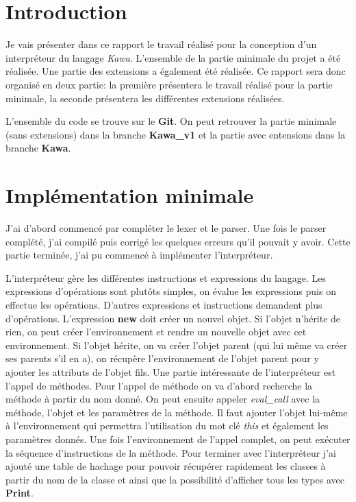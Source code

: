 \documentclass{article}
\begin{document}
\section{Introduction}
Je vais présenter dans ce rapport le travail réalisé pour la conception d'un interpréteur du langage \textit{Kawa}. L'ensemble de la partie minimale du projet a été réalisée. Une partie des 
extensions a également été réalisée. Ce rapport sera donc organisé en deux partie: la première présentera le travail réalisé pour la partie minimale, la seconde présentera les différentes 
extensions réalisées.

L'ensemble du code se trouve sur le \textbf{Git}. On peut retrouver la partie minimale (sans extensions) dans la branche \textbf{Kawa\_v1} et la partie avec entensions dans la 
branche \textbf{Kawa}.

\section{Implémentation minimale}
J'ai d'abord commencé par compléter le lexer et le parser. Une fois le parser complété, j'ai compilé puis corrigé les quelques erreurs qu'il pouvait y avoir.
Cette partie terminée, j'ai pu commencé à implémenter l'interpréteur.

L'interpréteur gère les différentes instructions et expressions du langage. Les expressions d'opérations sont plutôts simples, on évalue les expressions puis on effectue les opérations.
D'autres expressions et instructions demandent plus d'opérations.
L'expression \textbf{new} doit créer un nouvel objet. Si l'objet n'hérite de rien, on peut créer l'environnement et rendre un nouvelle objet avec cet environnement. Si l'objet hérite, 
on va créer l'objet parent (qui lui même va créer ses parents s'il en a), on récupère l'environnement de l'objet parent pour y ajouter les attributs de l'objet fils.
Une partie intéressante de l'interpréteur est l'appel de méthodes. Pour l'appel de méthode on va d'abord recherche la méthode à partir du nom donné. On peut ensuite appeler \textit{eval\_call} 
avec la méthode, l'objet et les paramètres de la méthode. Il faut ajouter l'objet lui-même à l'environnement qui permettra l'utilisation du mot clé \textit{this} et également les paramètres 
donnés. Une fois l'environnement de l'appel complet, on peut exécuter la séquence d'instructions de la méthode.
Pour terminer avec l'interpréteur j'ai ajouté une table de hachage pour pouvoir récupérer rapidement les classes 
à partir du nom de la classe et ainsi que la possibilité d'afficher tous les types avec \textbf{Print}.
\end{document}
